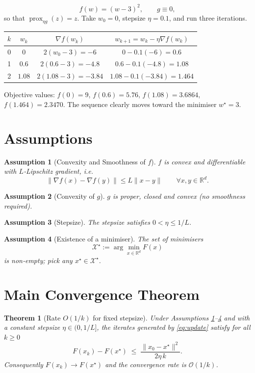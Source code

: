 \documentclass{article}
\newtheorem{theorem}{Theorem}
\newtheorem{assumption}{Assumption}
\newcommand{\prox}{\operatorname{prox}}
\newcommand{\R}{\mathbb{R}}
\begin{document}
\[
f(w)=(w-3)^{2},\qquad g\equiv 0,
\]
so that $\prox_{\eta g}(z)=z$.  
Take $w_{0}=0$, stepsize $\eta=0.1$, and run three iterations.

\begin{center}
\begin{tabular}{c|c|c|c}
$k$ & $w_{k}$ & $\nabla f(w_{k})$ & $w_{k+1}=w_{k}-\eta\nabla f(w_{k})$ \\ \hline
0 & $0$ & $2(w_{0}-3)=-6$ & $0-0.1(-6)=0.6$ \\
1 & $0.6$ & $2(0.6-3)=-4.8$ & $0.6-0.1(-4.8)=1.08$ \\
2 & $1.08$ & $2(1.08-3)=-3.84$ & $1.08-0.1(-3.84)=1.464$ \\
\end{tabular}
\end{center}

Objective values: $f(0)=9$, $f(0.6)=5.76$, $f(1.08)=3.6864$, $f(1.464)=2.3470$.  
The sequence clearly moves toward the minimiser $w^{\star}=3$.

\newpage

\section*{Assumptions}
\begin{assumption}[Convexity and Smoothness of $f$]\label{ass:f}
$f$ is convex and differentiable with $L$‑Lipschitz gradient, i.e.
\[
\|\nabla f(x)-\nabla f(y)\|\le L\|x-y\|\qquad\forall x,y\in\R^{d}.
\]
\end{assumption}
\begin{assumption}[Convexity of $g$]\label{ass:g}
$g$ is proper, closed and convex (no smoothness required).
\end{assumption}
\begin{assumption}[Stepsize]\label{ass:step}
The stepsize satisfies $0<\eta\le 1/L$.
\end{assumption}
\begin{assumption}[Existence of a minimiser]\label{ass:opt}
The set of minimisers 
\[
\mathcal{X}^{\star}:=\arg\min_{x\in\R^{d}}F(x)
\]
is non‑empty; pick any $x^{\star}\in\mathcal{X}^{\star}$.
\end{assumption}

\section*{Main Convergence Theorem}
\begin{theorem}[Rate $O(1/k)$ for fixed stepsize]\label{thm:rate}
Under Assumptions \ref{ass:f}–\ref{ass:opt} and with a constant stepsize $\eta\in(0,1/L]$, the iterates generated by \eqref{eq:update} satisfy for all $k\ge 0$
\[
F(x_{k})-F(x^{\star})\;\le\;\frac{\|x_{0}-x^{\star}\|^{2}}{2\eta\,k}.
\]
Consequently $F(x_{k})\to F(x^{\star})$ and the convergence rate is $\mathcal{O}(1/k)$.
\end{theorem}
\end{document}

